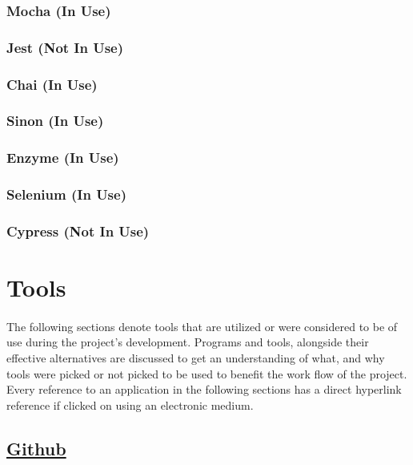 \documentclass[12pt]{article}
\begin{document}
\subsubsection{Mocha (In Use)}

\subsubsection{Jest (Not In Use)}

\subsubsection{Chai (In Use)}

\subsubsection{Sinon (In Use)}

\subsubsection{Enzyme (In Use)}

\subsubsection{Selenium (In Use)}

\subsubsection{Cypress (Not In Use)}



\newpage

\section{Tools}
\paragraph{}	The following sections denote tools that are utilized or were considered to be of use during the project's development. Programs and tools, alongside their effective alternatives are discussed to get an understanding of what, and why tools were picked or not picked to be used to benefit the work flow of the project. Every reference to an application in the following sections has a direct hyperlink reference if clicked on using an electronic medium.

\subsection{\href{https://Github.com}{Github}}
\end{document}
